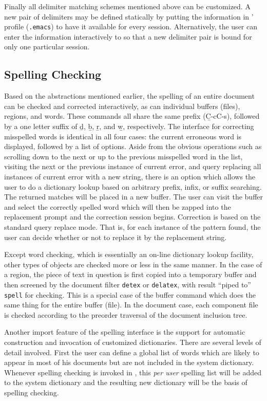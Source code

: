 Finally all delimiter matching schemes mentioned above can be customized.
A new pair of delimiters may be defined statically by putting 
the information in {\emacs}' profile (\verb|.emacs|) to have it available
for every {\TM} session.  Alternatively, the user can enter the information 
interactively to {\TM} so that a new delimiter pair is bound for only
one particular {\emacs} session.


\subsection{Spelling Checking}
Based on the abstractions mentioned earlier,
the spelling of an entire document can be checked
and corrected interactively, as can individual buffers (files), regions,
and words.  These commands all share the same prefix ({\b C-c{\s}C-s}),
followed by a one letter suffix of {\b d}, {\b b}, {\b r}, and {\b w},
respectively.
The interface for correcting misspelled words is identical in all four cases:
the current erroneous word is displayed, followed by a list of options.
Aside from the obvious operations
such as scrolling down to the next or up to the previous
misspelled word in the list, visiting the next or the previous
instance of current error, and query replacing all instances
of current error with a new string,
there is an option which allows the user to do a dictionary lookup based on
arbitrary prefix, infix, or suffix searching.  The returned matches will
be placed in a new buffer.  The user can visit the buffer and
select the correctly spelled word which will then be
zapped into the replacement prompt and the correction session begins.
Correction is based on the standard {\emacs} query replace mode.
That is, for each instance of the pattern found, the user can decide
whether or not to replace it by the replacement string.

Except word checking, which is essentially an on-line dictionary lookup
facility, other types of objects are checked more or less in the same manner.
In the case of a region, the piece of text in question
is first copied into a temporary buffer and then screened by the document
filter {\tt detex} or {\tt delatex}, with result ``piped to'' {\tt spell}
for checking.  This is a special case of the
buffer command which does the same thing for the entire buffer (file).
In the document case, each component file is
checked according to the preorder traversal of the document inclusion tree.

Another import feature of the spelling interface is the support for
automatic construction and invocation of customized dictionaries.
There are several levels of detail involved.
First the user can define a global list of words
which are likely to appear in most of his documents but are not included in
the system dictionary.  Whenever spelling checking is invoked in {\TM}, 
this {\it per user\/} spelling list will be added to the system dictionary
and the resulting new dictionary will be the basis of spelling checking.

